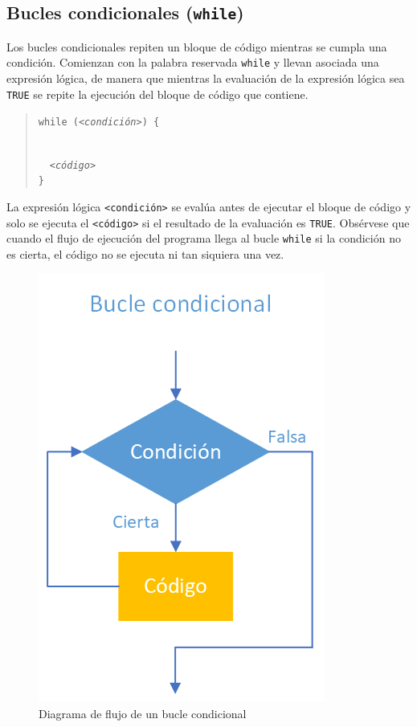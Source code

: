 \documentclass[
  a4paper,
]{scrreport}
\theoremstyle{definition}
\theoremstyle{definition}
\theoremstyle{remark}
\begin{document}
\hypertarget{bucles-condicionales-while}{%
\subsection{\texorpdfstring{Bucles condicionales
(\texttt{while})}{Bucles condicionales (while)}}\label{bucles-condicionales-while}}

Los bucles condicionales repiten un bloque de código mientras se cumpla
una condición. Comienzan con la palabra reservada \texttt{while} y
llevan asociada una expresión lógica, de manera que mientras la
evaluación de la expresión lógica sea \texttt{TRUE} se repite la
ejecución del bloque de código que contiene.

\begin{quote}
\texttt{while\ (}\emph{\texttt{\textless{}condición\textgreater{}}}\texttt{)\ \{}\strut \\
  \emph{\texttt{\textless{}código\textgreater{}}}\\
\texttt{\}}
\end{quote}

La expresión lógica \texttt{\textless{}condición\textgreater{}} se
evalúa antes de ejecutar el bloque de código y solo se ejecuta el
\texttt{\textless{}código\textgreater{}} si el resultado de la
evaluación es \texttt{TRUE}. Obsérvese que cuando el flujo de ejecución
del programa llega al bucle \texttt{while} si la condición no es cierta,
el código no se ejecuta ni tan siquiera una vez.

\begin{figure}

{\centering \includegraphics{./img/04-estructuras-control/bucle-while.png}

}

\caption{Diagrama de flujo de un bucle condicional}

\end{figure}
\end{document}
